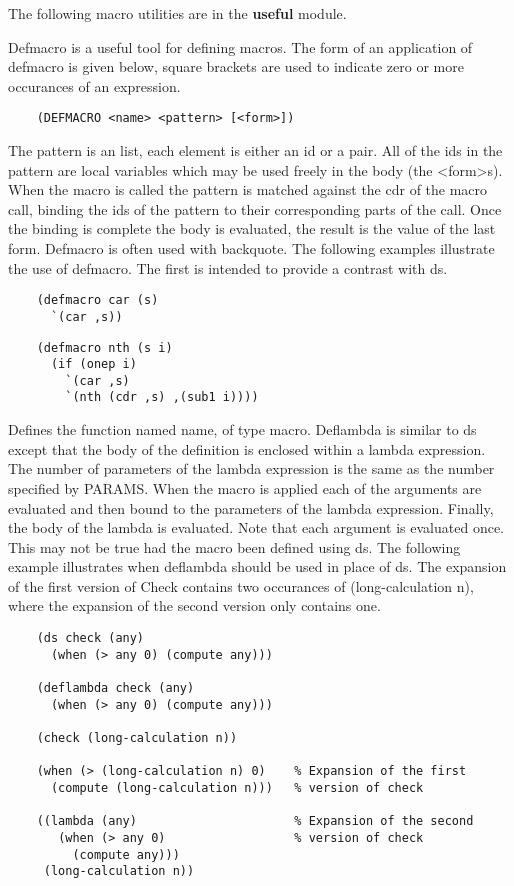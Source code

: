   The following macro utilities are in the {\bf useful} module.

{    Defmacro  is a useful tool for defining macros.  The form of
    an application of defmacro is given below,  square  brackets
    are   used  to  indicate  zero  or  more  occurances  of  an
    expression.
}
\begin{verbatim}
    (DEFMACRO <name> <pattern> [<form>])
\end{verbatim}
    The pattern is an list, each element is either an  id  or  a
    pair.    All  of  the ids in the pattern are local variables
    which may be used freely in the body (the  <form>s).    When
    the  macro  is called the pattern is matched against the cdr
    of the macro call, binding the ids of the pattern  to  their
    corresponding  parts  of  the  call.    Once  the binding is
    complete the body is evaluated, the result is the  value  of
    the  last form.  Defmacro is often used with backquote.  The
    following examples illustrate the  use  of  defmacro.    The
    first is intended to provide a contrast with ds.

\begin{verbatim}
    (defmacro car (s)
      `(car ,s))
\end{verbatim}
\begin{verbatim}
    (defmacro nth (s i)
      (if (onep i)
        `(car ,s)
        `(nth (cdr ,s) ,(sub1 i))))
\end{verbatim}

{    Defines  the  function named name, of type macro.  Deflambda
    is similar to ds except that the body of the  definition  is
    enclosed   within  a  lambda  expression.    The  number  of
    parameters of the lambda  expression  is  the  same  as  the
    number  specified by PARAMS.  When the macro is applied each
    of the  arguments  are  evaluated  and  then  bound  to  the
    parameters  of  the lambda expression.  Finally, the body of
    the lambda  is  evaluated.    Note  that  each  argument  is
    evaluated  once.    This  may not be true had the macro been
    defined using ds.  The following  example  illustrates  when
    deflambda  should  be used in place of ds.  The expansion of
    the first  version  of  Check  contains  two  occurances  of
    (long-calculation  n),  where  the  expansion  of the second
    version only contains one.
}
\begin{verbatim}
    (ds check (any)
      (when (> any 0) (compute any)))

    (deflambda check (any)
      (when (> any 0) (compute any)))

    (check (long-calculation n))

    (when (> (long-calculation n) 0)    % Expansion of the first
      (compute (long-calculation n)))   % version of check

    ((lambda (any)                      % Expansion of the second
       (when (> any 0)                  % version of check
         (compute any)))
     (long-calculation n))
\end{verbatim}

